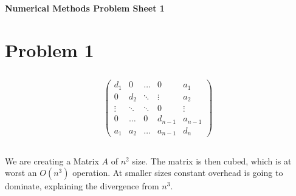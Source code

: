 \newcommand{\doctitle}{Numerical Methods Problem Sheet 1}



\begin{center}{\bfseries\Huge\doctitle}\end{center}

\section{Problem 1}
\subsection{}

$$ \left(\begin{array}{ccccc}
     d_1 & 0 & \hdots & 0 & a_1 \\
     0 & d_2 & \ddots & \vdots & a_2 \\
     \vdots & \ddots & \ddots & 0 & \vdots \\
     0 & \hdots & 0 & d_{n-1} & a_{n-1} \\
     a_1 & a_2 & \hdots & a_{n-1} & d_n
\end{array}\right) $$

\subsection{}

We are creating a Matrix $A$ of $n^2$ size. The matrix is then cubed, which is at worst an $O(n^3)$ operation. At smaller sizes constant overhead is going to dominate, explaining the divergence from $n^3$.

\subsection{}


\subsection{}


\subsection{}


\subsection{}




